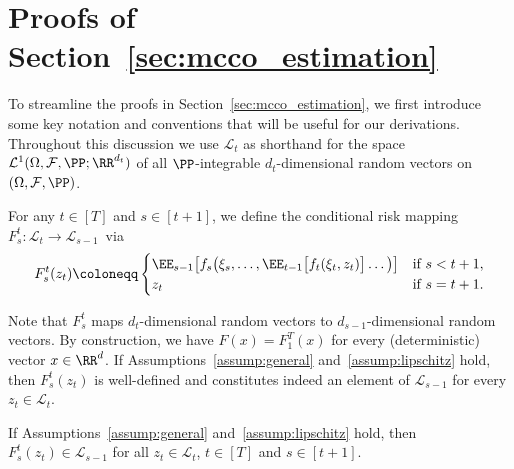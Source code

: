 \documentclass[11pt]{article}
\begin{document}
\section{Proofs of Section~\ref{sec:mcco_estimation}}

To streamline the proofs in Section~\ref{sec:mcco_estimation}, we first introduce some key notation and conventions that will be useful for our derivations. Throughout this discussion we use $\mathcal L_t$ as shorthand for the space $\mathcal L^1(\Omega,\mathcal F,\PP;\RR^{d_t})$ of all $\PP$-integrable $d_t$-dimensional random vectors on $(\Omega,\mathcal F,\PP)$. 

\begin{defn}
\label{def:risk-mapping}
For any $t\in[T]$ and $s\in[t+1]$, we define the conditional risk mapping $F_s^t : \mathcal L_t\to \mathcal L_{s-1}$~via
\begin{align*}
    F_s^t(z_t)\coloneqq \begin{cases}
        \EE_{s-1} \big[f_{s} \big(\xi_{s},\ldots ,\EE_{t-1} \big[ f_t(\xi_t, z_t ) \big] \ldots \big) \big] & \text{if } s<t+1, \\ z_t & \text{if } s=t+1.
    \end{cases}
\end{align*}
\end{defn}

Note that $F_s^t$ maps $d_t$-dimensional random vectors to $d_{s-1}$-dimensional random vectors. By construction, we have $F(x)=F_1^T(x)$ for every (deterministic) vector $x\in\RR^d$. If Assumptions~\ref{assump:general} and~\ref{assump:lipschitz} hold, then $F_s^t(z_t)$ is well-defined and constitutes indeed an element of $\mathcal L_{s-1}$ for every $z_t\in \mathcal L_{t}$.

\begin{lemma}
\label{lem:well-defined}
If Assumptions~\ref{assump:general} and~\ref{assump:lipschitz} hold, then $F_s^t(z_t)\in \mathcal L_{s-1}$ for all $z_t\in \mathcal L_{t}$, $t\in[T]$ and $s\in[t+1]$.
\end{lemma}
\end{document}
